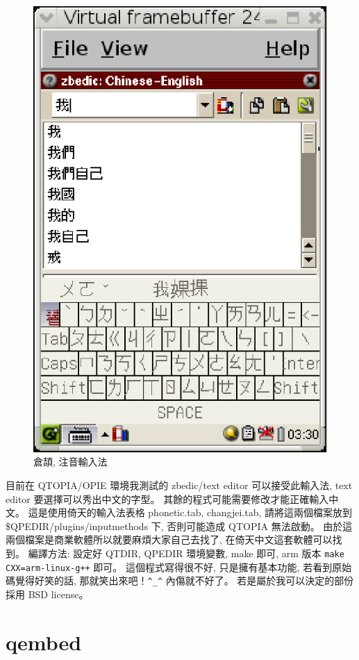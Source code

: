 \documentclass[12pt,a4paper]{article}
\begin{document}
\begin{CJK}{UTF8}{cwmu}
\begin{figure}[htbp]
\includegraphics[scale=0.9]{eps/phonetic.eps}
\caption{倉頡, 注音輸入法}
\end{figure}

 目前在 QTOPIA/OPIE 環境我測試的 zbedic/text editor 可以接受此輸入法,
 text editor 要選擇可以秀出中文的字型。
 其餘的程式可能需要修改才能正確輸入中文。
 這是使用倚天的輸入法表格 phonetic.tab, changjei.tab,
 請將這兩個檔案放到 \$QPEDIR/plugins/inputmethods 下,
 否則可能造成 QTOPIA 無法啟動。 	
 由於這兩個檔案是商業軟體所以就要麻煩大家自己去找了,
 在倚天中文這套軟體可以找到。
 編譯方法: 設定好 QTDIR, QPEDIR 環境變數,
 make 即可,
 arm 版本 \verb|make CXX=arm-linux-g++| 即可。
 這個程式寫得很不好, 只是擁有基本功能,
 若看到原始碼覺得好笑的話, 那就笑出來吧！\verb+^_^+
 內傷就不好了。
 若是屬於我可以決定的部份採用 BSD license。

\section{qembed}


\end{CJK}
\end{document}
